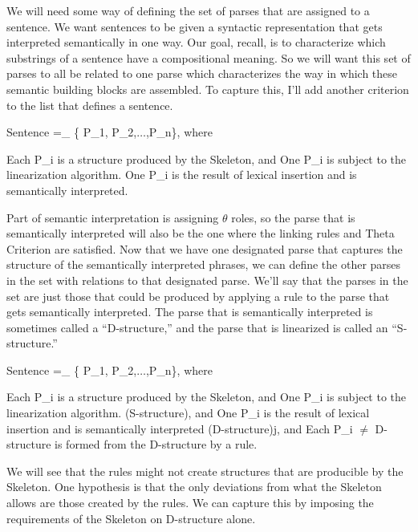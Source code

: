 We will need some way of defining the set of parses that are assigned to a sentence. We want sentences to be given a syntactic representation that gets interpreted semantically in one way. Our goal, recall, is to characterize which substrings of a sentence have a compositional meaning. So we will want this set of parses to all be related to one parse which characterizes the way in which these semantic building blocks are assembled. To capture this, I'll add another criterion to the list that defines a sentence.
\begin{exe}
	\raggedright
	\ex \label{ex3:der2s} 
	Sentence =_{} \{ P_1, P_2,$\ldots$,P_n\}, where
	\begin{xlist}
		\ex Each P_i is a structure produced by the  Skeleton, and
		\ex One P_i is subject to the linearization algorithm.
		\ex One P_i is the result of lexical insertion and is semantically interpreted.
	\end{xlist}
\end{exe}
Part of semantic interpretation is assigning $\theta$ roles, so the parse that is semantically interpreted will also be the one where the linking rules and Theta Criterion are satisfied. Now that we have one designated parse that captures the structure of the semantically interpreted phrases, we can define the other parses in the set with relations to that designated parse. We'll say that the parses in the set are just those that could be produced by applying a rule to the parse that gets semantically interpreted. The parse that is semantically interpreted is sometimes called a ``D-structure,'' and the parse that is linearized is called an ``S-structure.''
\begin{exe}
	\raggedright
	\ex \label{ex3:der22s} 
	Sentence =_{} \{ P_1, P_2,$\ldots$,P_n\}, where
	\begin{xlist}
		\ex Each P_i is a structure produced by the  Skeleton, and
		\ex One P_i is subject to the linearization algorithm. (S-structure), and
		\ex One P_i is the result of lexical insertion and is semantically interpreted (D-structure)j, and
		\ex Each P_i $\neq$ D-structure is formed from the D-structure by a rule.
	\end{xlist}
\end{exe}
We will see that the rules might not create structures that are producible by the  Skeleton. One hypothesis is that the only deviations from what the  Skeleton allows are those created by the rules. We can capture this by imposing the requirements of the  Skeleton on D-structure alone.
